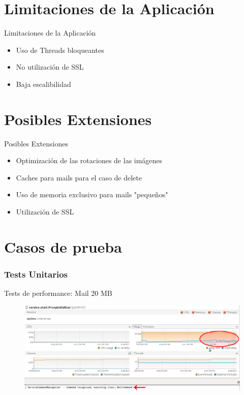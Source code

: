 \documentclass{beamer}
\begin{document}

\section{Limitaciones de la Aplicación}
\begin{frame}{Limitaciones de la Aplicación}
\begin{itemize}
\item Uso de Threads bloqueantes
\item No utilización de SSL
\item Baja escalibilidad
\end{itemize}
\end{frame}

\section{Posibles Extensiones}
\begin{frame}{Posibles Extensiones}
\begin{itemize}
\item Optimización de las rotaciones de las imágenes
\item Caches para mails para el caso de delete
\item Uso de memoria exclusivo para mails "pequeños"
\item Utilización de SSL
\end{itemize}
\end{frame}



\section{Casos de prueba}

\subsubsection{Tests Unitarios}
\begin{frame}{Tests de performance: Mail 20 MB}
\begin{figure}[H]
\begin{center}
\includegraphics[scale=0.26]{images/Stat1.png}
\label{stats1}
\end{center}
\end{figure}   
\end{frame}
\end{document}

